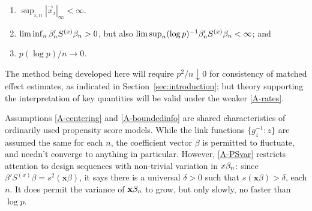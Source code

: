 \documentclass{article}
\newcounter{saveenumi}
\newcommand{\seti}{\setcounter{saveenumi}{\value{enumi}}}
\theoremstyle{remark}
\begin{document}
\begin{enumerate}
\item \label{A-boundedXes} $\sup_{i,n}|\vec{x}_{i}|_{\infty}  <\infty$.  %
\item\label{A-PSvar}  $\lim\inf_{n}\beta_{n }'S^{(x)}\beta_{n } >0$,  but also $\lim\sup_{n} (\log p)^{-1}\beta_{n }'S^{(x)}\beta_{n }  < \infty$; and
\item \label{A-rates} $p(\log p)/n \rightarrow 0$.%
\seti
\end{enumerate}
The method being developed here will require $p^2/n \downarrow 0$ for consistency of matched effect estimates, as indicated in Section~\ref{sec:introduction}; but theory supporting the interpretation of key quantities will be valid under the weaker \ref{A-rates}.

Assumptions \ref{A-centering} and \ref{A-boundedinfo} are shared characteristics of ordinarily used propensity score models.  While the link functions $\{g_{z}^{-1}: z\}$ are assumed the same for each $n$, the coefficient vector $\beta$ is permitted to fluctuate, and needn't converge to anything in particular.  However, \ref{A-PSvar} restricts attention to design sequences with non-trivial variation in ${x}\beta_{n } $: since $\beta'S^{(x)}\beta = s^{2}(\mathbf{x}\beta)$, it says there is a universal $\delta>0$ such that $s(\mathbf{x}\beta)>\delta$, each $n$.   It does permit the variance of $\mathbf{x}\beta_{n }$ to grow, but only slowly, no faster than $\log p$. 
\end{document}
